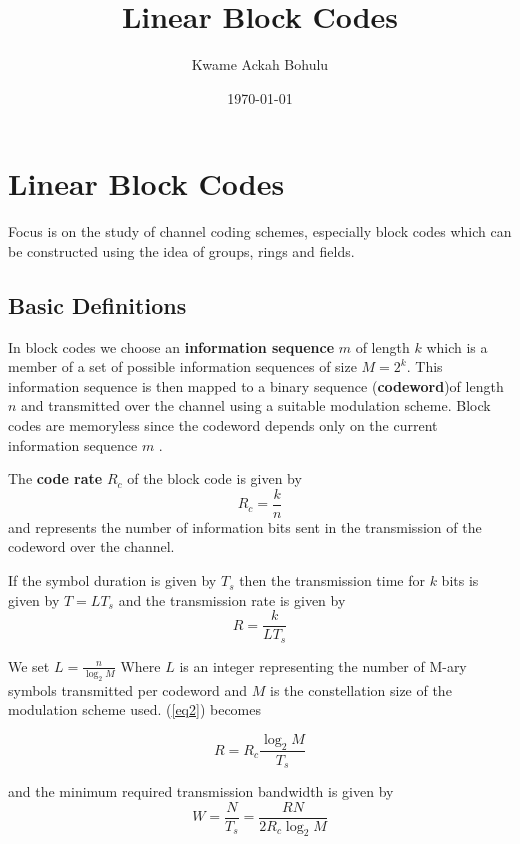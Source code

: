 \documentclass[fontsize=12pt]{article}
\title{Linear Block Codes }
\author{Kwame Ackah Bohulu}
\date{\today}
\begin{document}
\maketitle

\newpage
\section{Linear Block Codes}
Focus is on the study of channel coding schemes, especially block codes which can be constructed using the idea of groups, rings and fields. 

\subsection{Basic Definitions}
In block codes we choose an \textbf{information sequence} $m$ of length $k$ which is a member of a set of possible information sequences of size $M=2^k$. This information sequence is then mapped to a binary sequence (\textbf{codeword})of length $n$ and transmitted over the channel using a suitable modulation scheme. Block codes are memoryless since the codeword depends only on the current information sequence $m$ . 

The \textbf{code rate} $R_c$ of the block code is given by 
\begin{equation}
R_c=\frac{k}{n}
\end{equation}
and represents the number of information bits sent in the transmission of the codeword over the channel.

If the symbol duration is given by $T_s$ then the transmission time for $k$ bits is given by $T=LT_s$ and the transmission rate is given by
 \begin{equation}
 R=\frac{k}{LT_s}
 \label{eq2}
 \end{equation}

We set $L=\frac{n}{\log_2 M}$
Where $L$ is an integer representing the number of M-ary symbols transmitted per codeword and $M$ is the constellation size of the modulation scheme used. (\ref{eq2}) becomes

 \begin{equation}
 R=R_c\frac{\log_2M}{T_s}
 \label{eq3}
 \end{equation}
 
 and the minimum required transmission bandwidth is given by 
 \begin{equation}
 W=\frac{N}{T_s} = \frac{RN}{2R_c\log_2M}
  \label{eq4}
 \end{equation}
 
\end{document}
